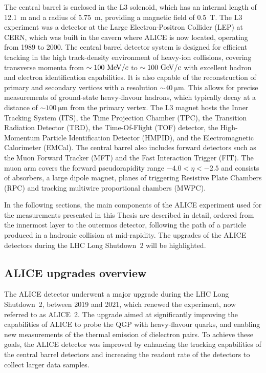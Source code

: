 The central barrel is enclosed in the L3 solenoid, which has an internal length of 12.1~m and a radius of 5.75~m, providing a magnetic field of 0.5~T. The L3 experiment was a detector at the Large Electron-Positron Collider (LEP) at CERN, which was built in the cavern where ALICE is now located, operating from 1989 to 2000. The central barrel detector system is designed for efficient tracking in the high track-density environment of heavy-ion collisions, covering transverse momenta from $\sim100~\mathrm{Me\kern-.1emV}/c$ to $\sim100~\mathrm{Ge\kern-.1emV}/c$ with excellent hadron and electron identification capabilities. It is also capable of the reconstruction of primary and secondary vertices with a resolution $\sim\SI{40}{\micro\meter}$. This allows for precise measurements of ground-state heavy-flavour hadrons, which typically decay at a distance of $\sim\SI{100}{\micro\meter}$ from the primary vertex. The L3 magnet hosts the Inner Tracking System (ITS), the Time Projection Chamber (TPC), the Transition Radiation Detector (TRD), the Time-Of-Flight (TOF) detector, the High-Momentum Particle Identification Detector (HMPID), and the Electromagnetic Calorimeter (EMCal). The central barrel also includes forward detectors such as the Muon Forward Tracker (MFT) and the Fast Interaction Trigger (FIT). The muon arm covers the forward pseudorapidity range $-4.0 < \eta < -2.5$ and consists of absorbers, a large dipole magnet, planes of triggering Resistive Plate Chambers (RPC) and tracking multiwire proportional chambers (MWPC).

In the following sections, the main components of the ALICE experiment used for the measurements presented in this Thesis are described in detail, ordered from the innermost layer to the outermos detector, following the path of a particle produced in a hadronic collision at mid-rapidity. The upgrades of the ALICE detectors during the LHC Long Shutdown~2 will be highlighted.

\subsection{ALICE upgrades overview}
The ALICE detector underwent a major upgrade during the LHC Long Shutdown~2, between 2019 and 2021, which renewed the experiment, now referred to as ALICE~2. The upgrade aimed at significantly improving the capabilities of ALICE to probe the QGP with heavy-flavour quarks, and enabling new measurements of the thermal emission of dielectron pairs. To achieve these goals, the ALICE detector was improved by enhancing the tracking capabilities of the central barrel detectors and increasing the readout rate of the detectors to collect larger data samples. 

